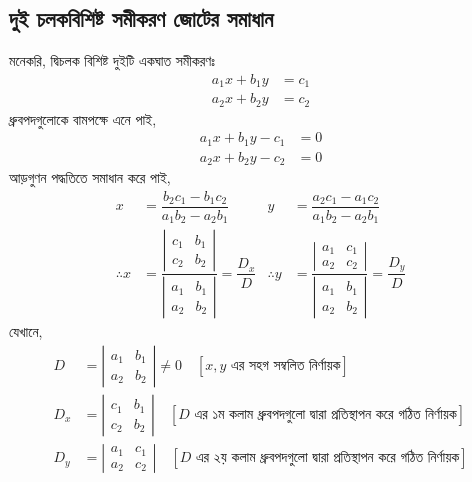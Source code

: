 \subsection{দুই চলকবিশিষ্ট সমীকরণ জোটের সমাধান}
মনেকরি, দ্বিচলক বিশিষ্ট দুইটি একঘাত সমীকরণঃ
\begin{align}
	a_1x+b_1y &= c_1 \tag{1} \\
	a_2x+b_2y &= c_2 \tag{2} 
\end{align}
ধ্রুবপদগুলোকে বামপক্ষে এনে পাই, 
\begin{align}
	a_1x+b_1y-c_1 &= 0 \tag{1} \\
	a_2x+b_2y-c_2 &= 0 \tag{2} 
\end{align}
আড়গুণন পদ্ধতিতে সমাধান করে পাই,  
\begin{align*}
	 x &= \dfrac{b_2c_1-b_1c_2}{a_1b_2-a_2b_1}  & y &=\dfrac{a_2c_1-a_1c_2}{a_1b_2-a_2b_1} \\
	\therefore x &= \dfrac{\left|\begin{array}{cc}
		c_1 & b_1 \\
		c_2 & b_2
		\end{array}\right|}{\left|\begin{array}{cc}
		a_1 & b_1 \\
		a_2 & b_2
		\end{array}\right|}=\dfrac{D_{x}}{D} & \therefore y &= \dfrac{\left|\begin{array}{cc}
		a_1 & c_1 \\
		a_2 & c_2
		\end{array}\right|}{\left|\begin{array}{cc}
		a_1 & b_1 \\
		a_2 & b_2
		\end{array}\right|}=\dfrac{D_{y}}{D}
\end{align*}
যেখানে, 
\begin{align*}
	D &= \left|\begin{array}{cc}
	a_1 & b_1 \\
	a_2 & b_2
	\end{array}\right|\neq 0 \quad [x,y \text{ এর সহগ সম্বলিত নির্ণায়ক}] \\
	D_x &= \left|\begin{array}{cc}
	c_1 & b_1 \\
	c_2 & b_2
	\end{array}\right| \quad [D \text{ এর ১ম কলাম ধ্রুবপদগুলো দ্বারা প্রতিস্থাপন করে গঠিত নির্ণায়ক}]\\
	D_y &= \left|\begin{array}{cc}
	a_1 & c_1 \\
	a_2 & c_2
	\end{array}\right| \quad [D \text{ এর ২য় কলাম ধ্রুবপদগুলো দ্বারা প্রতিস্থাপন করে গঠিত নির্ণায়ক}]
\end{align*}
\newpage
